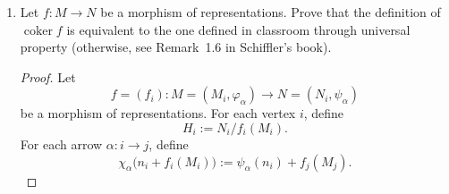 \documentclass[11pt, a4paper]{article}
\begin{document}
\begin{enumerate}[leftmargin=*, label=\textbf{\arabic*.}]
\begin{enumerate}[label=(\alph*)]
\begin{proof}
    For $p$, the commutativity diagram at each arrow $\delta$ is
    \[
    \begin{tikzcd}
    M_\lambda(2) = k \arrow[r, "M_\lambda(\delta)"] \arrow[d, "p_2=\mathrm{id}_k"'] & M_\lambda(1) = k \arrow[d, "p_1=0"] \\
    S(2)(2) = k \arrow[r, "0"'] & S(2)(1) = 0
    \end{tikzcd}
    \]
    Both compositions give $0$, so the diagram commutes.
    
    \medskip\noindent\textbf{Exactness.}
    
    $\iota$ is injective: $\iota_1=\mathrm{id}_k$ is injective.
    
    $p$ is surjective: $p_2=\mathrm{id}_k$ is surjective.
    
    Exactness at $M_\lambda$: we verify $\ker p = \operatorname{im}\iota$ at each vertex.
    \begin{itemize}
    \item Vertex~$1$:
    \[
    \ker(p_1\colon k\to 0) = k = \operatorname{im}(\iota_1) = \operatorname{im}(\mathrm{id}_k) = k.
    \]
    \item Vertex~$2$:
    \[
    \ker(p_2) = \ker(\mathrm{id}_k) = 0 = \operatorname{im}(\iota_2) = \operatorname{im}(0) = 0.
    \]
    \end{itemize}
    
    Hence
    \[
    0 \longrightarrow S(1) \xrightarrow{\;\iota\;} M_\lambda \xrightarrow{\;p\;} S(2) \longrightarrow 0
    \]
    is a short exact sequence.
    \end{proof}
\end{enumerate}

\item Let $f \colon M \to N$ be a morphism of representations. Prove that the definition of $\operatorname{coker} f$ is equivalent to the one defined in classroom through universal property (otherwise, see Remark~1.6 in Schiffler's book).

\begin{proof}
    Let
    \[
    f=(f_i):M=(M_i,\varphi_\alpha)\to N=(N_i,\psi_\alpha)
    \]
    be a morphism of representations. For each vertex $i$, define
    \[
    H_i:=N_i/f_i(M_i).
    \]
    For each arrow $\alpha:i\to j$, define
    \[
    \chi_\alpha\bigl(n_i+f_i(M_i)\bigr):=\psi_\alpha(n_i)+f_j(M_j).
    \]
    

\end{proof}
\end{enumerate}
\end{document}
